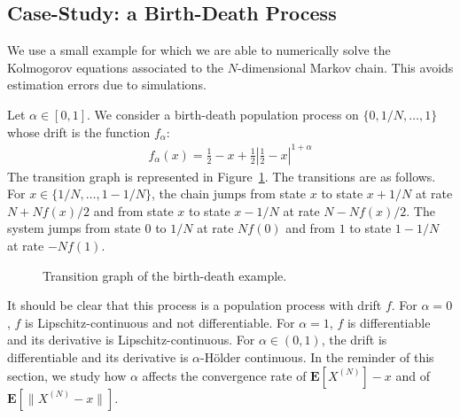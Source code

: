 \documentclass[sigconf]{acmart}
\newcommand\XN{X^{(N)}}
\newcommand\sesp[1]{\mathbf{E}[#1]}
\newcommand\snorm[1]{\|#1\|}
\newcommand\abs[1]{\left|#1\right|}
\begin{document}
\subsection{Case-Study: a Birth-Death Process}

We use a small example for which we are able to numerically solve the
Kolmogorov equations associated to the $N$-dimensional Markov
chain. This avoids estimation errors due to simulations.

Let $\alpha\in[0,1]$. We consider a birth-death population process on
$\{0,1/N,\dots,1\}$ whose drift is the function $f_\alpha$:
\begin{align*}
  f_\alpha(x) = 
  \frac12-x + \frac12\abs{\frac12-x}^{1+\alpha} 
\end{align*}
The transition graph is represented in Figure~\ref{fig:BD_graph}.  The
transitions are as follows. For $x\in\{1/N,\dots,1-1/N\}$, the chain
jumps from state $x$ to state $x+1/N$ at rate $N+Nf(x)/2$ and from
state $x$ to state $x-1/N$ at rate $N-Nf(x)/2$. The system jumps from
state $0$ to $1/N$ at rate $Nf(0)$ and from $1$ to state $1-1/N$ at
rate $-Nf(1)$.
\begin{figure}[ht]
  \caption{Transition graph of the birth-death example. }
  \label{fig:BD_graph}
\end{figure}

It should be clear that this process is a population process with
drift $f$.  For $\alpha=0$, $f$ is Lipschitz-continuous and not
differentiable. For $\alpha=1$, $f$ is differentiable and its
derivative is Lipschitz-continuous. For $\alpha\in(0,1)$, the drift is
differentiable and its derivative is $\alpha$-Hölder
continuous. 
In the reminder of this section, we study how $\alpha$ affects the
convergence rate of $\sesp{\XN}-x$ and of $\sesp{\snorm{\XN-x}}$.
\end{document}

